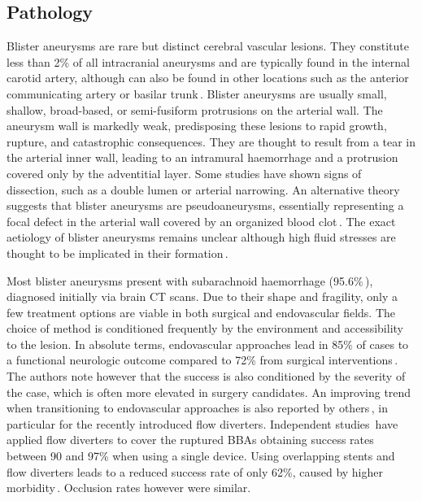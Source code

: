 \subsection{Pathology}
Blister aneurysms are rare but distinct cerebral vascular lesions. They constitute less than 2\% of all intracranial aneurysms and are typically found in the internal carotid artery, although can also be found in other locations such as the anterior communicating artery or basilar trunk\,\cite{Nasra2021, Papasilekas2020}. Blister aneurysms are usually small, shallow, broad-based, or semi-fusiform protrusions on the arterial wall. The aneurysm wall is markedly weak, predisposing these lesions to rapid growth, rupture, and catastrophic consequences. They are thought to result from a tear in the arterial inner wall, leading to an intramural haemorrhage and a protrusion covered only by the adventitial layer. Some studies have shown signs of dissection, such as a double lumen or arterial narrowing. An alternative theory suggests that blister aneurysms are pseudoaneurysms, essentially representing a focal defect in the arterial wall covered by an organized blood clot\,\cite{Papasilekas2020}. The exact aetiology of blister aneurysms remains unclear although high fluid stresses are thought to be implicated in their formation\,\cite{Gonzalez2014,  Song_Oh_Kim_Chung_Lim_Kim_Shin_2016, Nasra2021}.

Most blister aneurysms present with subarachnoid haemorrhage (95.6\%\,\cite{Nasra2021}), diagnosed initially via brain CT scans. Due to their shape and fragility, only a few treatment options are viable in both surgical and endovascular fields. The choice of method is conditioned frequently by the environment and accessibility to the lesion. In absolute terms, endovascular approaches lead in 85\% of cases to a functional neurologic outcome compared to 72\% from surgical interventions\,\cite{Nasra2021}. The authors note however that the success is also conditioned by the severity of the case, which is often more elevated in surgery candidates. An improving trend when transitioning to endovascular approaches is also reported by others\,\cite{Gonzalez2014, Song_Oh_Kim_Chung_Lim_Kim_Shin_2016, Peschillo2016}, in particular for the recently introduced flow diverters. Independent studies\,\cite{Mokin2018, Zhu2018} have applied flow diverters to cover the ruptured BBAs obtaining success rates between 90 and 97\% when using a single device. Using overlapping stents and flow diverters leads to a reduced success rate of only 62\%, caused by higher morbidity\,\cite{Zhu2018}. Occlusion rates however were similar.

